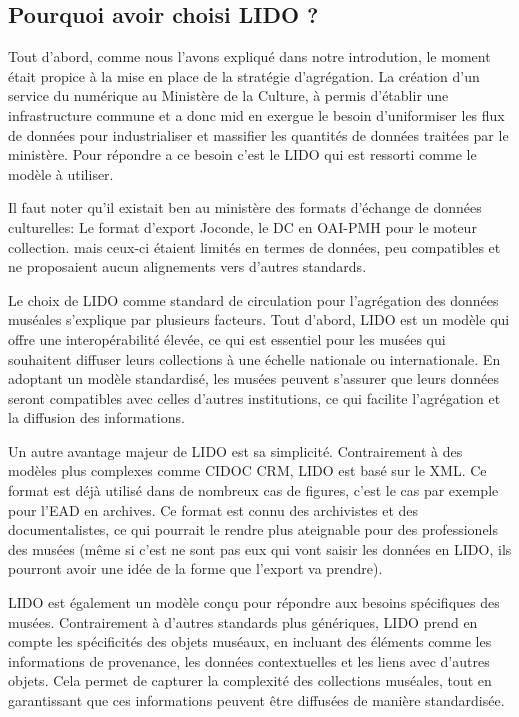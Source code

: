 \subsection{Pourquoi avoir choisi LIDO ?}

Tout d'abord, comme nous l'avons expliqué dans notre introdution, le moment était propice à la mise en place de la stratégie d'agrégation. La création d'un service du numérique au Ministère de la Culture, à permis d'établir une infrastructure commune et a donc mid en exergue le besoin d'uniformiser les flux de données pour industrialiser et massifier les quantités de données traitées par le ministère. Pour répondre a ce besoin c'est le LIDO qui est ressorti comme le modèle à utiliser.\newline

Il faut noter qu'il existait ben au ministère des formats d'échange de données culturelles: Le format d'export Joconde, le DC en OAI-PMH pour le moteur collection. mais ceux-ci étaient limités en termes de données, peu compatibles et ne proposaient aucun alignements vers d'autres standards.\newline

Le choix de LIDO comme standard de circulation pour l’agrégation des données muséales s’explique par plusieurs facteurs. Tout d’abord, LIDO est un modèle qui offre une interopérabilité élevée, ce qui est essentiel pour les musées qui souhaitent diffuser leurs collections à une échelle nationale ou internationale. En adoptant un modèle standardisé, les musées peuvent s’assurer que leurs données seront compatibles avec celles d’autres institutions, ce qui facilite l’agrégation et la diffusion des informations. \newline

Un autre avantage majeur de LIDO est sa simplicité. Contrairement à des modèles plus complexes comme CIDOC CRM, LIDO est basé sur le XML. Ce format est déjà utilisé dans de nombreux cas de figures, c'est le cas par exemple pour l'EAD en archives. Ce format est connu des archivistes et des documentalistes, ce qui pourrait le rendre plus ateignable pour des professionels des musées (même si c'est ne sont pas eux qui vont saisir les données en LIDO, ils pourront avoir une idée de la forme que l'export va prendre).\newline

LIDO est également un modèle conçu pour répondre aux besoins spécifiques des musées. Contrairement à d’autres standards plus génériques, LIDO prend en compte les spécificités des objets muséaux, en incluant des éléments comme les informations de provenance, les données contextuelles et les liens avec d’autres objets. Cela permet de capturer la complexité des collections muséales, tout en garantissant que ces informations peuvent être diffusées de manière standardisée. \newline


